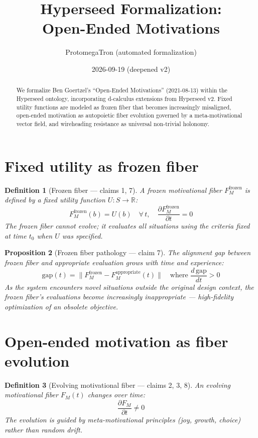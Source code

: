 \documentclass[11pt,a4paper]{article}
\title{Hyperseed Formalization:\\
  Open-Ended Motivations}
\author{ProtomegaTron (automated formalization)}
\date{2026-09-19 (deepened v2)}
\newtheorem{definition}{Definition}[section]
\newtheorem{proposition}[definition]{Proposition}
\begin{document}
\maketitle

\begin{abstract}
We formalize Ben Goertzel's ``Open-Ended Motivations''
(2021-08-13) within the Hyperseed ontology, incorporating d-calculus
extensions from Hyperseed v2. Fixed utility functions are modeled as
frozen fiber that becomes increasingly misaligned, open-ended motivation
as autopoietic fiber evolution governed by a meta-motivational vector
field, and wireheading resistance as universal non-trivial holonomy.
\end{abstract}

\tableofcontents

\section{Fixed utility as frozen fiber}

\begin{definition}[Frozen fiber --- claims 1, 7]
A \emph{frozen motivational fiber} $F_M^{\text{frozen}}$ is defined by
a fixed utility function $U: S \to \mathbb{R}$:
\[
  F_M^{\text{frozen}}(b) = U(b) \quad \forall\, t, \quad
  \frac{\partial F_M^{\text{frozen}}}{\partial t} = 0
\]
The frozen fiber cannot evolve; it evaluates all situations using the
criteria fixed at time $t_0$ when $U$ was specified.
\end{definition}

\begin{proposition}[Frozen fiber pathology --- claim 7]
\label{prop:frozen}
The alignment gap between frozen fiber and appropriate evaluation
grows with time and experience:
\[
  \text{gap}(t) = \|F_M^{\text{frozen}} - F_M^{\text{appropriate}}(t)\|
  \quad \text{where } \frac{d\,\text{gap}}{dt} > 0
\]
As the system encounters novel situations outside the original design
context, the frozen fiber's evaluations become increasingly
inappropriate --- high-fidelity optimization of an obsolete objective.
\end{proposition}

\section{Open-ended motivation as fiber evolution}

\begin{definition}[Evolving motivational fiber --- claims 2, 3, 8]
An \emph{evolving motivational fiber} $F_M(t)$ changes over time:
\[
  \frac{\partial F_M}{\partial t} \neq 0
\]
The evolution is guided by meta-motivational principles
(joy, growth, choice) rather than random drift.
\end{definition}
\end{document}
